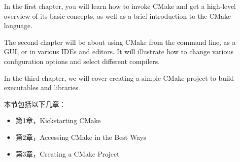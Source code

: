 
In the first chapter, you will learn how to invoke CMake and get a high-level overview of its basic concepts, as well as a brief introduction to the CMake language.

The second chapter will be about using CMake from the command line, as a GUI, or in various IDEs and editors. It will illustrate how to change various configuration options and select different compilers.

In the third chapter, we will cover creating a simple CMake project to build executables and libraries.

本节包括以下几章：

\begin{itemize}
\item 第1章，Kickstarting CMake
\item 第2章，Accessing CMake in the Best Ways
\item 第3章，Creating a CMake Project
\end{itemize}